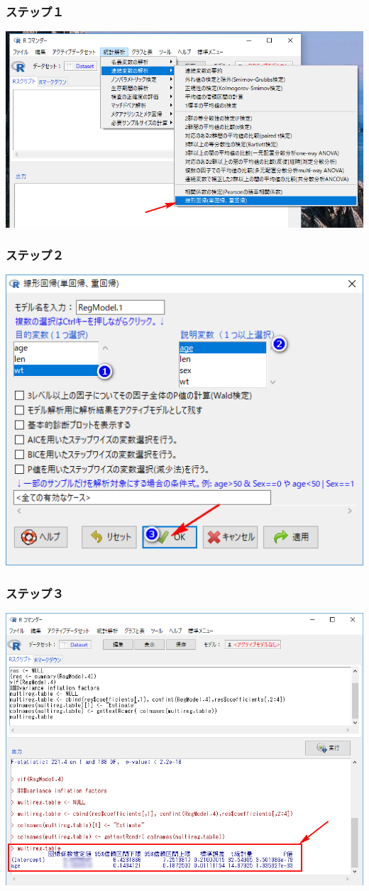 \documentclass[11pt,]{problemset}
\begin{document}
\hypertarget{-5}{%
\subsubsection{ステップ１}\label{-5}}

\begin{center}\includegraphics[width=0.8\linewidth]{pic/lm00} \end{center}

\hypertarget{-6}{%
\subsubsection{ステップ２}\label{-6}}

\begin{center}\includegraphics[width=0.6\linewidth]{pic/lm01} \end{center}

\hypertarget{-7}{%
\subsubsection{ステップ３}\label{-7}}

\begin{center}\includegraphics[width=0.8\linewidth]{pic/lm02cut} \end{center}
\end{document}
